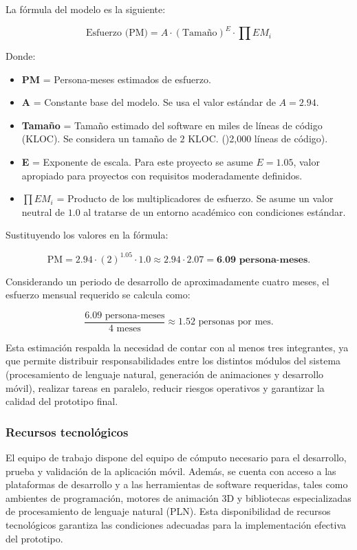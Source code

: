 La fórmula del modelo es la siguiente:

\[
\text{Esfuerzo (PM)} = A \cdot (\text{Tamaño})^E \cdot \prod EM_i
\]

Donde:

\begin{itemize}
	\item \textbf{PM} = Persona-meses estimados de esfuerzo.
	\item \textbf{A} = Constante base del modelo. Se usa el valor estándar de $A = 2.94$.
	\item \textbf{Tamaño} = Tamaño estimado del software en miles de líneas de código (KLOC). Se considera un tamaño de $2$ KLOC. ()2,000 líneas de código).
	\item \textbf{E} = Exponente de escala. Para este proyecto se asume $E = 1.05$, valor apropiado para proyectos con requisitos moderadamente definidos.
	\item $\prod EM_i$ = Producto de los multiplicadores de esfuerzo. Se asume un valor neutral de $1.0$ al tratarse de un entorno académico con condiciones estándar.
\end{itemize}

Sustituyendo los valores en la fórmula:

\[
\text{PM} = 2.94 \cdot (2)^{1.05} \cdot 1.0 \approx 2.94 \cdot 2.07 = \textbf{6.09 persona-meses.}
\]

Considerando un periodo de desarrollo de aproximadamente cuatro meses, el esfuerzo mensual requerido se calcula como:

\[
\frac{6.09 \text{ persona-meses}}{4 \text{ meses}} \approx 1.52 \text{ personas por mes.}
\]

Esta estimación respalda la necesidad de contar con al menos tres integrantes, ya que permite distribuir responsabilidades entre los distintos módulos del sistema (procesamiento de lenguaje natural, generación de animaciones y desarrollo móvil), realizar tareas en paralelo, reducir riesgos operativos y garantizar la calidad del prototipo final.


\subsubsection{Recursos tecnológicos}
El equipo de trabajo dispone del equipo de cómputo necesario para el desarrollo, prueba y validación de la aplicación móvil. Además, se cuenta con acceso a las plataformas de desarrollo y a las herramientas de software requeridas, tales como ambientes de programación, motores de animación 3D y bibliotecas especializadas de procesamiento de lenguaje natural (PLN). Esta disponibilidad de recursos tecnológicos garantiza las condiciones adecuadas para la implementación efectiva del prototipo.

